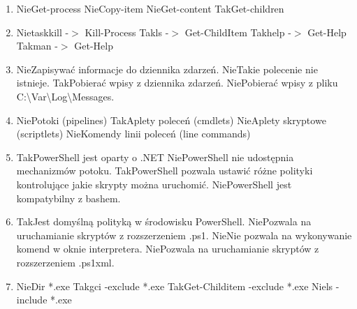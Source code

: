 \begin{enumerate}
		\newpage
		\item {}%
		{Nie}{Get-process}%
		{Nie}{Copy-item}%
		{Nie}{Get-content}%
		{Tak}{Get-children}
		\item {}%
		{Nie}{taskkill -$>$ Kill-Process}%
		{Tak}{ls -$>$ Get-ChildItem}%
		{Tak}{help -$>$ Get-Help}%
		{Tak}{man -$>$ Get-Help}
		\item {}%
		{Nie}{Zapisywać informacje do dziennika zdarzeń.}%
		{Nie}{Takie polecenie nie istnieje.}%
		{Tak}{Pobierać wpisy z dziennika zdarzeń.}%
		{Nie}{Pobierać wpisy z pliku C:\textbackslash Var\textbackslash Log\textbackslash Messages.}
		\item {}%
		{Nie}{Potoki (pipelines)}%
		{Tak}{Aplety poleceń (cmdlets)}%
		{Nie}{Aplety skryptowe (scriptlets)}%
		{Nie}{Komendy linii poleceń (line commands)}
		\item {}%
		{Tak}{PowerShell jest oparty o .NET}%
		{Nie}{PowerShell nie udostępnia mechanizmów potoku.}%
		{Tak}{PowerShell pozwala ustawić różne polityki kontrolujące jakie skrypty można uruchomić.}%
		{Nie}{PowerShell jest kompatybilny z bashem.}
		\item {}%
		{Tak}{Jest domyślną polityką w środowisku PowerShell.}%
		{Nie}{Pozwala na uruchamianie skryptów z rozszerzeniem .ps1.}%
		{Nie}{Nie pozwala na wykonywanie komend w oknie interpretera.}%
		{Nie}{Pozwala na uruchamianie skryptów z rozszerzeniem .ps1xml.}
		\item {}%
		{Nie}{Dir *.exe}%
		{Tak}{gci -exclude *.exe}%
		{Tak}{Get-Childitem -exclude *.exe}%
		{Nie}{ls -include *.exe}
		

\end{enumerate}
